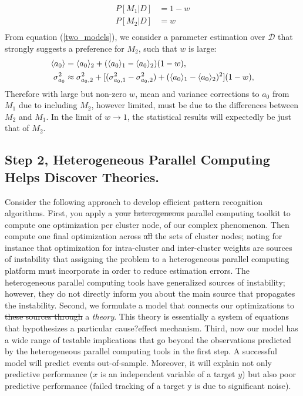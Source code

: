 \documentclass[10pt]{article}[draft]
\begin{document}
\begin{equation}
	\begin{split}
	P[M_1|D]  & = 1 - w \\
	P[M_2|D]  & =  w \\
	\end{split}
\label{two_models}
\end{equation}
From equation (\ref{two_models}), we consider a parameter estimation over $\mathcal{D}$ that strongly suggests a preference for $M_2$, such that $w$ is large:
\begin{equation}
	\begin{split}
		\inn{a_0} & = \inn{a_0}_2 + ( \inn{a_0}_1 - \inn{a_0}_2) (1- w), \\
		\sigma^2_{a_0} & \approx \sigma^2_{a_0,2} +[ (\sigma^2_{a_0,1} - \sigma^2_{a_0,2})   + ( \inn{a_0}_1 - \inn{a_0}_2)^2 ](1- w),
	\end{split}
\end{equation}
Therefore with large but non-zero $w$, mean and variance corrections to $a_0$ from $M_1$ due to including $M_2$, however limited, must be due to the differences between $M_2$ and $M_1$. In the limit of $w \rightarrow 1$, the statistical results will expectedly be just that of $M_2$. 


\vspace{0.25in}


\subsection{Step 2, Heterogeneous Parallel Computing Helps Discover Theories.}




Consider the following approach to develop efficient pattern recognition algorithms. First, you apply a \st{your} \st{heterogeneous} parallel computing toolkit to compute one optimization per cluster node, of our complex phenomenon. Then compute one final optimization across \st{all} the sets of cluster nodes; noting for instance that optimization for intra-cluster and inter-cluster weights are sources of instability that assigning the problem to a heterogeneous parallel computing platform  must incorporate in order to reduce estimation errors. The heterogeneous parallel computing tools have generalized  sources of instability; however, they do not directly inform you about the main source that propagates the instability. Second, we formulate a model that connects our optimizations to  \st{these sources through} a \emph{theory}. This theory is essentially a system of equations that hypothesizes a particular cause?effect mechanism. Third, now our model has a wide range of testable implications that go beyond the observations predicted by the heterogeneous parallel computing tools in the first step. A successful model will predict events out-of-sample. Moreover, it will explain not only predictive performance ($x$ is an independent variable of a target $y$) but also poor predictive performance (failed tracking of a target y is due to significant noise). 
	
\end{document}
